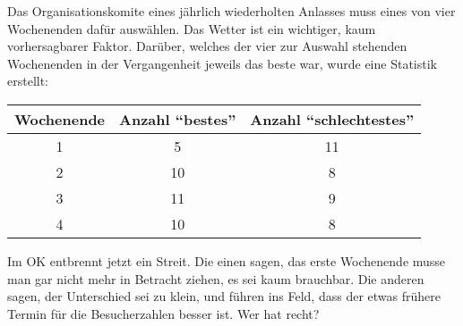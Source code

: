 Das Organisationskomite eines jährlich wiederholten Anlasses muss
eines von vier Wochenenden dafür auswählen.
Das Wetter ist ein wichtiger, kaum vorhersagbarer Faktor.
Darüber, welches der vier zur Auswahl stehenden Wochenenden
in der Vergangenheit jeweils das beste war, wurde eine Statistik
erstellt:
\begin{center}
\begin{tabular}{ccc}
\hline
Wochenende&Anzahl ``bestes''&Anzahl ``schlechtestes''\\
\hline
1&5&11\\
2&10&8\\
3&11&9\\
4&10&8\\
\hline
\end{tabular}
\end{center}
Im OK entbrennt jetzt ein Streit. Die einen sagen, das erste Wochenende
musse man gar nicht mehr in Betracht ziehen, es sei kaum brauchbar.
Die anderen sagen, der Unterschied sei zu klein, und führen ins Feld,
dass der etwas frühere Termin für die Besucherzahlen besser ist.
Wer hat recht?



